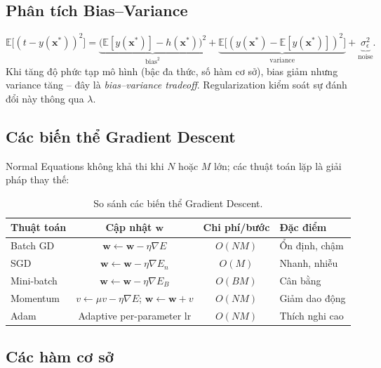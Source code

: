 \documentclass[12pt, a4paper]{article}
\begin{document}
\subsection{Phân tích Bias--Variance}

\begin{equation}
  \mathbb{E}\bigl[(t - y(\mathbf{x}^*))^2\bigr]
  = \underbrace{\bigl(\mathbb{E}[y(\mathbf{x}^*)] - h(\mathbf{x}^*)\bigr)^2}_{\text{bias}^2}
  + \underbrace{\mathbb{E}\bigl[(y(\mathbf{x}^*) - \mathbb{E}[y(\mathbf{x}^*)])^2\bigr]}_{\text{variance}}
  + \underbrace{\sigma^2_\epsilon}_{\text{noise}}.
  \label{eq:bias_variance}
\end{equation}
Khi tăng độ phức tạp mô hình (bậc đa thức, số hàm cơ sở), bias giảm nhưng variance
tăng -- đây là \emph{bias--variance tradeoff}. Regularization kiểm soát sự đánh đổi
này thông qua $\lambda$.

\subsection{Các biến thể Gradient Descent}

Normal Equations không khả thi khi $N$ hoặc $M$ lớn; các thuật toán lặp là giải pháp
thay thế:

\begin{table}[H]
  \centering
  \caption{So sánh các biến thể Gradient Descent.}
  \label{tab:gd_variants}
  \begin{tabular}{lccl}
    \toprule
    \textbf{Thuật toán} & \textbf{Cập nhật $\mathbf{w}$} & \textbf{Chi phí/bước} & \textbf{Đặc điểm} \\
    \midrule
    Batch GD   & $\mathbf{w} \leftarrow \mathbf{w} - \eta\nabla E$               & $O(NM)$ & Ổn định, chậm \\
    SGD        & $\mathbf{w} \leftarrow \mathbf{w} - \eta\nabla E_n$             & $O(M)$  & Nhanh, nhiễu \\
    Mini-batch & $\mathbf{w} \leftarrow \mathbf{w} - \eta\nabla E_B$             & $O(BM)$ & Cân bằng \\
    Momentum   & $v \leftarrow \mu v - \eta\nabla E$; $\mathbf{w} \leftarrow \mathbf{w}+v$ & $O(NM)$ & Giảm dao động \\
    Adam       & Adaptive per-parameter lr                                         & $O(NM)$ & Thích nghi cao \\
    \bottomrule
  \end{tabular}
\end{table}

\subsection{Các hàm cơ sở}
\end{document}
